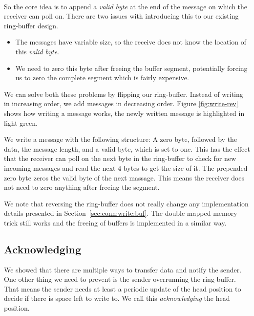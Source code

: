 \paragraph{} So the core idea is to append a \emph{valid byte} at the end of the message on which the receiver can poll on.
There are two issues with introducing this to our existing ring-buffer design.

\begin{itemize}
  \item The messages have variable size, so the receive does not know the location of this \emph{valid byte}.
  \item We need to zero this byte after freeing the buffer segment, potentially forcing us to zero the complete segment 
    which is fairly expensive.
\end{itemize}

We can solve both these problems by flipping our ring-buffer. Instead of writing in increasing order, we add messages in 
decreasing order. Figure \ref{fig:write-rev} shows how writing a message works, the newly written message is highlighted in 
light green. 

We write a message with the following structure: 
A zero byte, followed by the data, the message length, and a valid byte, which is set to one. This has the effect that the
receiver can poll on the next byte in the ring-buffer to check for new incoming messages and read the next 4 bytes to get 
the size of it. The prepended zero byte zeros the valid byte of the next massage. This means the receiver does not 
need to zero anything after freeing the segment.




We note that reversing the ring-buffer does not really change any implementation details presented in 
Section~\ref{sec:conn:write:buf}. The double mapped memory trick still works and the freeing of buffers is implemented in a
similar way.

\subsection{Acknowledging}

We showed that there are multiple ways to transfer data and notify the sender. One other thing we need to prevent is the
sender  overrunning the ring-buffer. That means the sender needs at least a periodic update of the head position to decide if
there is space left to write to. We call this \emph{acknowledging} the head position.

